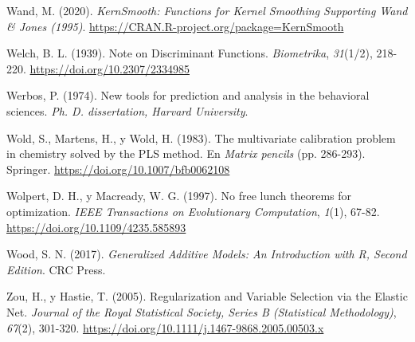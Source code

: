 \documentclass[
  spanish,
]{book}
\theoremstyle{break}
\theoremstyle{definition}
\theoremstyle{definition}
\theoremstyle{definition}
\theoremstyle{remark}
\begin{document}
\leavevmode\hypertarget{ref-R-KernSmooth}{}%
Wand, M. (2020). \emph{KernSmooth: Functions for Kernel Smoothing Supporting Wand \& Jones (1995)}. \url{https://CRAN.R-project.org/package=KernSmooth}

\leavevmode\hypertarget{ref-welch1939note}{}%
Welch, B. L. (1939). Note on Discriminant Functions. \emph{Biometrika}, \emph{31}(1/2), 218-220. \url{https://doi.org/10.2307/2334985}

\leavevmode\hypertarget{ref-werbos1974new}{}%
Werbos, P. (1974). New tools for prediction and analysis in the behavioral sciences. \emph{Ph. D. dissertation, Harvard University}.

\leavevmode\hypertarget{ref-wold1983multivariate}{}%
Wold, S., Martens, H., y Wold, H. (1983). The multivariate calibration problem in chemistry solved by the PLS method. En \emph{Matrix pencils} (pp. 286-293). Springer. \url{https://doi.org/10.1007/bfb0062108}

\leavevmode\hypertarget{ref-wolpert1997no}{}%
Wolpert, D. H., y Macready, W. G. (1997). No free lunch theorems for optimization. \emph{IEEE Transactions on Evolutionary Computation}, \emph{1}(1), 67-82. \url{https://doi.org/10.1109/4235.585893}

\leavevmode\hypertarget{ref-wood2017generalized}{}%
Wood, S. N. (2017). \emph{Generalized Additive Models: An Introduction with R, Second Edition}. CRC Press.

\leavevmode\hypertarget{ref-zou2005regularization}{}%
Zou, H., y Hastie, T. (2005). Regularization and Variable Selection via the Elastic Net. \emph{Journal of the Royal Statistical Society, Series B (Statistical Methodology)}, \emph{67}(2), 301-320. \url{https://doi.org/10.1111/j.1467-9868.2005.00503.x}
\end{document}
